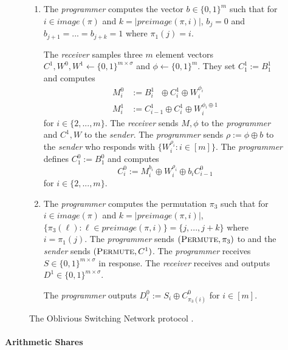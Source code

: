 \begin{figure}[ht!]
{\begin{minipage}{0.95\linewidth}
\begin{enumerate}
\begin{enumerate}
					The \emph{programmer}  sends $(\textsc{Permute}, \pi_1)$ to  and the \emph{sender} sends $(\textsc{Permute}, A)$. The \emph{programmer} receives $B^{0}\in \{0,1\}^{m\times \sigma}$ in response and the \emph{receiver} receives $B^{1}\in \{0,1\}^{m\times \sigma}$. 
					
					\item The \emph{programmer}  computes the vector $b\in\{0,1\}^{m}$ such that for $i\in image(\pi)$ and $k=|preimage(\pi, i)|$, $b_j = 0$ and $b_{j+1}=...=b_{j+k}=1$ where $\pi_1(j)=i$.
					
					The \emph{receiver} samples three $m$ element vectors $C^{1}, W^0,W^1\gets \{0,1\}^{m\times \sigma}$ and $\phi\gets\{0,1\}^m$. They set $C^{1}_1:=B^{1}_1$ and computes 
					\begin{align*}
						M^0_i&:= B^1_{i}\ \ \, \oplus C^{1}_i \oplus W^{\phi_i}_i\\
						M^1_i&:= C^1_{i-1} \oplus C^{1}_i \oplus W^{\phi_i\oplus 1}_i
					\end{align*}
					for $i\in \{2,...,m\}$. The \emph{receiver} sends $M,\phi$ to the \emph{programmer} and $C^{1},W$ to the \emph{sender}. The \emph{programmer} sends $\rho:=\phi\oplus b$ to the \emph{sender} who responds with $\{ W^{\rho_i}_i : i\in [m] \}$. The \emph{programmer} defines $C^{0}_1:=B^{0}_1$ and computes 
					$$
						C^{0}_i:= M^{b_i}_i \oplus W^{\rho_i}_i\oplus b_iC^{0}_{i-1}
					$$
					for $i\in \{2,...,m\}$.
					\item The \emph{programmer} computes the permutation $\pi_3$ such that for  $i\in image(\pi)$ and $k=|preimage(\pi, i)|$, $\{\pi_3(\ell) : \ell\in preimage(\pi, i)\}=\{j, ..., j +k\}$ where $i=\pi_1(j)$.	The \emph{programmer} sends $(\textsc{Permute}, \pi_3)$ to  and the \emph{sender} sends $(\textsc{Permute}, C^{1})$.  The \emph{programmer} receives $S\in \{0,1\}^{m\times \sigma }$ in response. The \emph{receiver} receives and outputs $D^{1}\in \{0,1\}^{m\times \sigma }$.
					
					The \emph{programmer} outputs $D^{0}_i:=S_i\oplus C^{0}_{\pi_3(i)}$ for $i\in [m]$.
				\end{enumerate}
			\end{enumerate}
	\end{minipage}}
	\caption{The Oblivious Switching Network protocol . }
	\label{fig:switching-net}	
\end{figure}


\paragraph{Arithmetic Shares}


